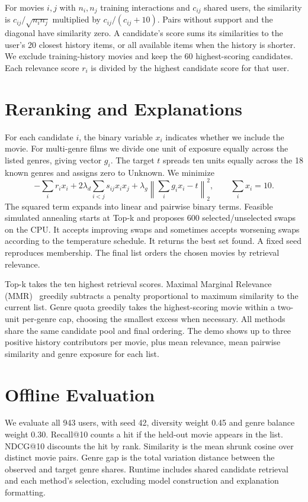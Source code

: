 \documentclass[10pt,a4paper]{article}
\begin{document}
For movies $i,j$ with $n_i,n_j$ training interactions and $c_{ij}$ shared users, the similarity is $c_{ij}/\sqrt{n_i n_j}$ multiplied by $c_{ij}/(c_{ij}+10)$. Pairs without support and the diagonal have similarity zero. A candidate's score sums its similarities to the user's 20 closest history items, or all available items when the history is shorter. We exclude training-history movies and keep the 60 highest-scoring candidates. Each relevance score $r_i$ is divided by the highest candidate score for that user.

\section{Reranking and Explanations}
For each candidate $i$, the binary variable $x_i$ indicates whether we include the movie. For multi-genre films we divide one unit of exposure equally across the listed genres, giving vector $g_i$. The target $t$ spreads ten units equally across the 18 known genres and assigns zero to Unknown. We minimize
\[
-\sum_i r_i x_i
+2\lambda_d\sum_{i<j} s_{ij} x_i x_j
+\lambda_g \left\|\sum_i g_i x_i-t\right\|_2^2,
\qquad \sum_i x_i=10.
\]
The squared term expands into linear and pairwise binary terms. Feasible simulated annealing starts at Top-k and proposes 600 selected/unselected swaps on the CPU. It accepts improving swaps and sometimes accepts worsening swaps according to the temperature schedule. It returns the best set found. A fixed seed reproduces membership. The final list orders the chosen movies by retrieval relevance.

Top-k takes the ten highest retrieval scores. Maximal Marginal Relevance (MMR)~\cite{mmr} greedily subtracts a penalty proportional to maximum similarity to the current list. Genre quota greedily takes the highest-scoring movie within a two-unit per-genre cap, choosing the smallest excess when necessary. All methods share the same candidate pool and final ordering. The demo shows up to three positive history contributors per movie, plus mean relevance, mean pairwise similarity and genre exposure for each list.


\clearpage
\section{Offline Evaluation}
We evaluate all 943 users, with seed 42, diversity weight 0.45 and genre balance weight 0.30. Recall@10 counts a hit if the held-out movie appears in the list. NDCG@10 discounts the hit by rank. Similarity is the mean shrunk cosine over distinct movie pairs. Genre gap is the total variation distance between the observed and target genre shares. Runtime includes shared candidate retrieval and each method's selection, excluding model construction and explanation formatting.
\end{document}
